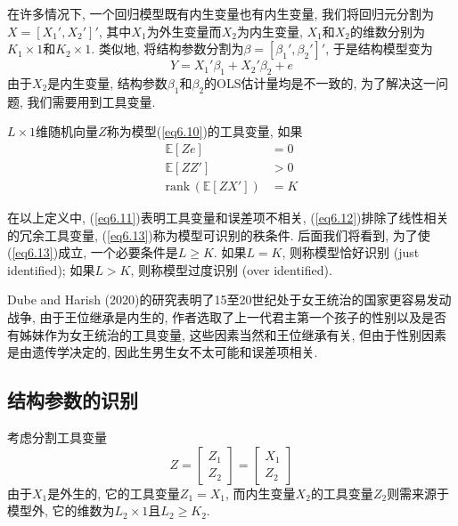 \documentclass[cn, 12pt, math=mtpro2, bibstyle=apa, blue, twocol]{elegantbook}
\newcommand{\E}{\mathbb{E}}
\begin{document}
在许多情况下, 一个回归模型既有内生变量也有内生变量, 我们将回归元分割为$X=[X_1',X_2']'$, 其中$X_1$为外生变量而$X_2$为内生变量, $X_1$和$X_2$的维数分别为$K_1\times1$和$K_2\times1$. 类似地, 将结构参数分割为$\beta=[\beta_1',\beta_2']'$, 于是结构模型变为
\begin{equation}\label{eq6.10}
  Y=X_1'\beta_1+X_2'\beta_2+e
\end{equation}
由于$X_2$是内生变量, 结构参数$\beta_1$和$\beta_2$的OLS估计量均是不一致的, 为了解决这一问题, 我们需要用到工具变量.
\begin{definition}\label{def:def6.1}
$L\times1$维随机向量$Z$称为模型(\ref{eq6.10})的工具变量, 如果
\begin{align}
\E[Ze]&=0 \label{eq6.11} \\
\E[ZZ']&>0 \label{eq6.12} \\
\text{rank}\,(\E[ZX'])&=K \label{eq6.13}
\end{align}
\end{definition}
在以上定义中, (\ref{eq6.11})表明工具变量和误差项不相关, (\ref{eq6.12})排除了线性相关的冗余工具变量, (\ref{eq6.13})称为模型可识别的秩条件. 后面我们将看到, 为了使(\ref{eq6.13})成立, 一个必要条件是$L\geq K$. 如果$L=K$, 则称模型恰好识别 (just identified); 如果$L>K$, 则称模型过度识别 (over identified).

\begin{example}
Dube and Harish (2020)的研究表明了15至20世纪处于女王统治的国家更容易发动战争, 由于王位继承是内生的, 作者选取了上一代君主第一个孩子的性别以及是否有姊妹作为女王统治的工具变量, 这些因素当然和王位继承有关, 但由于性别因素是由遗传学决定的, 因此生男生女不太可能和误差项相关.
\end{example}

\subsection{结构参数的识别}
考虑分割工具变量
$$Z=\begin{bmatrix}
      Z_1 \\
      Z_2
    \end{bmatrix}=\begin{bmatrix}
                    X_1 \\
                    Z_2
                  \end{bmatrix}$$
由于$X_1$是外生的, 它的工具变量$Z_1=X_1$, 而内生变量$X_2$的工具变量$Z_2$则需来源于模型外, 它的维数为$L_2\times 1$且$L_2\geq K_2$.
\end{document}
